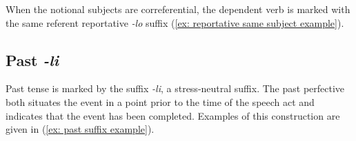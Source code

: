  When the notional subjects are correferential, the dependent verb is marked with the same referent reportative \textit{-lo} suffix (\ref{ex: reportative same subject example}).

\ea\label{ex: reportative same subject example}

    \z
\z

\subsection{Past \textit{-li}}
\label{subsec: past}

Past tense is marked by the suffix \textit{-li}, a stress-neutral suffix. The past perfective both situates the event in a point prior to the time of the speech act and indicates that the event has been completed. Examples of this construction are given in (\ref{ex: past suffix example}).

\ea\label{ex: past suffix example}

